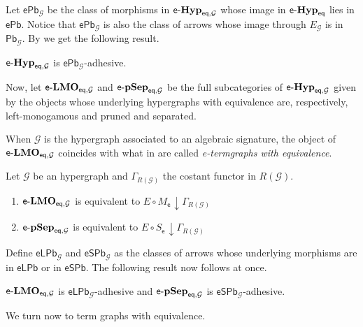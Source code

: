 \documentclass[3p]{elsarticle}
\newcommand{\pbc}{\mathsf{Pb}}
\newcommand{\pbe}{\mathsf{ePb}}
\newcommand{\epbl}{\mathsf{eLPb}}
\newcommand{\epbs}{\mathsf{eSPb}}
\newcommand{\eq}{\mathsf{eq}}
\newcommand{\eg}[0]{\mathbf{EGG}}
\newcommand{\catname}[1]{\textbf{\textup{#1}}}
\newcommand{\EqTG}{\catname{EqTG}}
\newcommand{\egg}{\mathsf{e}\text{-}\catname{Hyp}_\eq}
\newcommand{\eggl}{\mathsf{e}\text{-}\catname{Hyp}_{\eq, \mathcal{G}}}
\newcommand{\lelm}{\mathsf{e}\text{-}\catname{LMO}_{\eq, \mathcal{G}}}
\newcommand{\leps}{\mathsf{e}\text{-}\catname{pSep}_{\eq, \mathcal{G}}}
\renewcommand{\comma}[2]{#1\hspace{1pt} {\downarrow}#2}
\theoremstyle{remark}
\theoremstyle{definition}
\begin{document}
Let $\pbe_\mathcal{G}$ be the class of morphisms in $\eggl$ whose image in $\egg$ lies in $\pbe$. Notice that $\pbe_\mathcal{G}$ is also the class of arrows whose image through $E_\mathcal{G}$ is in $\pbc_\mathcal{G}$.
%
By  we get the following result.

\begin{cor}\label{cor:eggade1}
	$\eggl$ is $\pbe_\mathcal{G}$-adhesive.
\end{cor}

Now, let $\lelm$ and $\leps$ be the full subcategories of $\eggl$ given by the objects whose underlying hypergraphs with equivalence are, respectively, left-monogamous and pruned and separated. 


\begin{rem}
When $\mathcal{G}$ is the hypergraph associated to an algebraic signature, the object of  $\lelm$ coincides with what in \cite{uovadesive} are called \emph{e-termgraphs with equivalence}. 
\end{rem}

\begin{lem}Let $\mathcal{G}$ be an hypergraph and $\Gamma_{R(\mathcal{G})}$ the costant functor in $R(\mathcal{G})$. 
	\begin{enumerate}
		\item $\lelm$ is equivalent to $\comma{E\circ M_{\mathsf{e}}}{\Gamma_{R(\mathcal{G})}}$
		\item $\leps$ is equivalent to $\comma{E\circ S_{\mathsf{e}}}{\Gamma_{R(\mathcal{G})}}$
	\end{enumerate}
\end{lem}

Define $\epbl_{\mathcal{G}}$ and $\epbs_{\mathcal{G}}$ as the classes of arrows whose underlying morphisms are in $\epbl$ or in $\epbs$. The following result now follows at once.

\begin{cor}
	$\lelm$ is $\epbl_{\mathcal{G}}$-adhesive and $\leps$ is $\epbs_{\mathcal{G}}$-adhesive.
\end{cor}


\iffalse 
We turn now to term graphs with equivalence.

\end{document}
